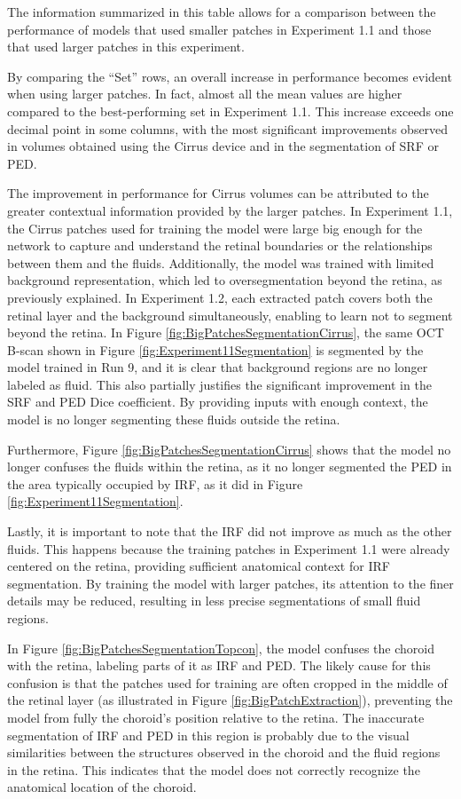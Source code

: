 The information summarized in this table allows for a comparison between the performance of models that used smaller patches in Experiment 1.1 and those that used larger patches in this experiment.
\par
By comparing the ``Set'' rows, an overall increase in performance becomes evident when using larger patches. In fact, almost all the mean values are higher compared to the best-performing set in Experiment 1.1. This increase exceeds one decimal point in some columns, with the most significant improvements observed in volumes obtained using the Cirrus device and in the segmentation of SRF or PED.
\par
The improvement in performance for Cirrus volumes can be attributed to the greater contextual information provided by the larger patches. In Experiment 1.1, the Cirrus patches used for training the model were large big enough for the network to capture and understand the retinal boundaries or the relationships between them and the fluids. Additionally, the model was trained with limited background representation, which led to oversegmentation beyond the retina, as previously explained. In Experiment 1.2, each extracted patch covers both the retinal layer and the background simultaneously, enabling to learn not to segment beyond the retina. In Figure \ref{fig:BigPatchesSegmentationCirrus}, the same OCT B-scan shown in Figure \ref{fig:Experiment11Segmentation} is segmented by the model trained in Run 9, and it is clear that background regions are no longer labeled as fluid. This also partially justifies the significant improvement in the SRF and PED Dice coefficient. By providing inputs with enough context, the model is no longer segmenting these fluids outside the retina. 
\par
Furthermore, Figure \ref{fig:BigPatchesSegmentationCirrus} shows that the model no longer confuses the fluids within the retina, as it no longer segmented the PED in the area typically occupied by IRF, as it did in Figure \ref{fig:Experiment11Segmentation}.
\par
Lastly, it is important to note that the IRF did not improve as much as the other fluids. This happens because the training patches in Experiment 1.1 were already centered on the retina, providing sufficient anatomical context for IRF segmentation. By training the model with larger patches, its attention to the finer details may be reduced, resulting in less precise segmentations of small fluid regions.
\par
In Figure \ref{fig:BigPatchesSegmentationTopcon}, the model confuses the choroid with the retina, labeling parts of it as IRF and PED. The likely cause for this confusion is that the patches used for training are often cropped in the middle of the retinal layer (as illustrated in Figure \ref{fig:BigPatchExtraction}), preventing the model from fully the choroid's position relative to the retina. The inaccurate segmentation of IRF and PED in this region is probably due to the visual similarities between the structures observed in the choroid and the fluid regions in the retina. This indicates that the model does not correctly recognize the anatomical location of the choroid.

